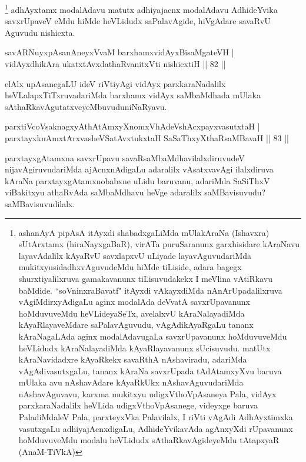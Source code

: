 \begin{artha}%
\footnote{ashanAyA pipAsA itAyxdi shabadxgaLiMda mUlakAraNa (Ishavxra) sUtArxtamx (hiraNayxgaBaR), virATa puruSaranunx garxhisidare kAraNavu layavAdalilx kAyaRvU savxlapxvU uLiyade layavAguvudariMda mukitxyusidadhxvAguvudeMdu hiMde tiLiside, adara bagegx shurxtiyalilxruva gamakavanunx tiLisuvudakekx I meVlina vAtiRkavu baMdide. ``soV\s ninxraBavatf" itAyxdi vAkayxdiMda nAnArUpadalilxruva vAgiMdirxyAdigaLu aginx modalAda deVvatA savxrUpavanunx hoMduvuveMdu heVLideyaSeTx, avelalxvU kAraNalayadiMda kAyaRlayaveMdare saPalavAguvudu, vAgAdikAyaRgaLu tananx kAraNagaLAda aginx modalAdavugaLa savxrUpavanunx hoMduvuveMdu heVLidudx kAraNalayadiMda kAyaRlayavanunx sUcisuvudu. matUtx kAraNavidadxre kAyaRkekx savaRthA nAshaviradu, adariMda vAgAdivasutxgaLu, tananx kAraNa savxrUpada tAdAtamxyXvu baruva mUlaka avu nAshavAdare kAyaRkUkx nAshavAguvudariMda nAshavAguvavu, karxma mukitxyu udigxVthoVpAsaneya Pala, vidAyx parxkaraNadalilx heVLida udigxVthoVpAsanege, videyxge baruva PaladiMdaleV Pala, parxteyxVka Palavilalx, I riVti vAgAdi AdhAyxtimxka vasutxgaLu adhiyajAcnxdigaLu, AdhideYvikavAda agAnxyXdi rUpavanunx hoMduvuveMdu modalu heVLidudx sAthaRkavAgideyeMdu tAtapxyaR (AnaM-TiVkA)} adhAyxtamx modalAdavu matutx adhiyajacnx modalAdavu AdhideYvika savxrUpaveV eMdu hiMde heVLidudx saPalavAgide, hiVgAdare savaRvU Aguvudu nishicxta.
\end{artha}

\begin{shl}
savARNuyxpAsanAneyxVvaM barxhamxvidAyxBisaMgateVH |\\
vidAyxdhikAra ukatxtAvxdathaRvanitxVti nishicxtiH \hfill || 82 ||
\end{shl}

\begin{artha}%
elAlx upAsanegaLU ideV riVtiyAgi vidAyx parxkaraNadalilx heVLalapxTiTxruvadariMda barxhamx vidAyx saMbaMdhada mUlaka sAthaRkavAgutatxveyeMbuvudu\break niNaRyavu.
\end{artha}

\begin{shl}
parxtiVcoV\s saknagxyAthAtAmxyXnomxVhAdeVshAcxpayxvasutxtaH |\\
parxtayxknAmxtArxvasheVSatAvxtukxtaH SaSaThxyXthaRsaMBavaH \hfill || 83 ||
\end{shl}

\begin{artha}
parxtayxgAtamxna savxrUpavu savaRsaMbaMdhavilalxdiruvudeV nijavAgiruvudariMda ajAcnxnAdigaLu adaralilx vAsatxvavAgi ilalxdiruva kAraNa parxtayxgAtamxnobabxne uLidu baruvanu, adariMda SaSiThxV viBakitxyu athaRvAda saMbaMdhavu heVge adaralilx saMBavisuvudu?\break saMBavisuvudilalx.
\end{artha}

